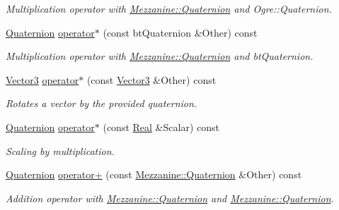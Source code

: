 \begin{DoxyCompactItemize}
\begin{DoxyCompactList}\small\item\em Multiplication operator with \hyperlink{classMezzanine_1_1Quaternion}{Mezzanine::Quaternion} and Ogre::Quaternion. \item\end{DoxyCompactList}\item 
\hyperlink{classMezzanine_1_1Quaternion}{Quaternion} \hyperlink{classMezzanine_1_1Quaternion_ac0476b5a3b8301905865d1d38c79fc67}{operator$\ast$} (const btQuaternion \&Other) const 
\begin{DoxyCompactList}\small\item\em Multiplication operator with \hyperlink{classMezzanine_1_1Quaternion}{Mezzanine::Quaternion} and btQuaternion. \item\end{DoxyCompactList}\item 
\hyperlink{classMezzanine_1_1Vector3}{Vector3} \hyperlink{classMezzanine_1_1Quaternion_a26e4cc96e10317d217569eba576e9018}{operator$\ast$} (const \hyperlink{classMezzanine_1_1Vector3}{Vector3} \&Other) const 
\begin{DoxyCompactList}\small\item\em Rotates a vector by the provided quaternion. \item\end{DoxyCompactList}\item 
\hyperlink{classMezzanine_1_1Quaternion}{Quaternion} \hyperlink{classMezzanine_1_1Quaternion_a61e1e32521a5353287f158c091d41aaa}{operator$\ast$} (const \hyperlink{namespaceMezzanine_a726731b1a7df72bf3583e4a97282c6f6}{Real} \&Scalar) const 
\begin{DoxyCompactList}\small\item\em Scaling by multiplication. \item\end{DoxyCompactList}\item 
\hyperlink{classMezzanine_1_1Quaternion}{Quaternion} \hyperlink{classMezzanine_1_1Quaternion_aaf72c453f146323b4375976bddfef251}{operator+} (const \hyperlink{classMezzanine_1_1Quaternion}{Mezzanine::Quaternion} \&Other) const 
\begin{DoxyCompactList}\small\item\em Addition operator with \hyperlink{classMezzanine_1_1Quaternion}{Mezzanine::Quaternion} and \hyperlink{classMezzanine_1_1Quaternion}{Mezzanine::Quaternion}. \item\end{DoxyCompactList}\item 

\end{DoxyCompactItemize}
